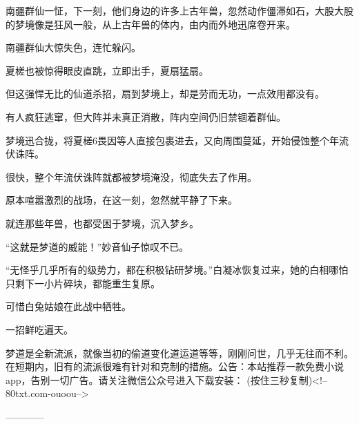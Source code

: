 \begin{this_body}
南疆群仙一怔，下一刻，他们身边的许多上古年兽，忽然动作僵滞如石，大股大股的梦境像是狂风一般，从上古年兽的体内，由内而外地迅席卷开来。

南疆群仙大惊失色，连忙躲闪。

夏槎也被惊得眼皮直跳，立即出手，夏扇猛扇。

但这强悍无比的仙道杀招，扇到梦境上，却是劳而无功，一点效用都没有。

有人疯狂逃窜，但大阵并未真正消散，阵内空间仍旧禁锢着群仙。

梦境迅合拢，将夏槎6畏因等人直接包裹进去，又向周围蔓延，开始侵蚀整个年流伏诛阵。

很快，整个年流伏诛阵就都被梦境淹没，彻底失去了作用。

原本喧嚣激烈的战场，在这一刻，忽然就平静了下来。

就连那些年兽，也都受困于梦境，沉入梦乡。

“这就是梦道的威能！”妙音仙子惊叹不已。

“无怪乎几乎所有的级势力，都在积极钻研梦境。”白凝冰恢复过来，她的白相哪怕只剩下一小片碎块，都能重生复原。

可惜白兔姑娘在此战中牺牲。

一招鲜吃遍天。

梦道是全新流派，就像当初的偷道变化道运道等等，刚刚问世，几乎无往而不利。在短期内，旧有的流派很难有针对和克制的措施。公告：本站推荐一款免费小说app，告别一切广告。请关注微信公众号进入下载安装： (按住三秒复制)<!--80txt.com-ouoou-->

------------

\end{this_body}

